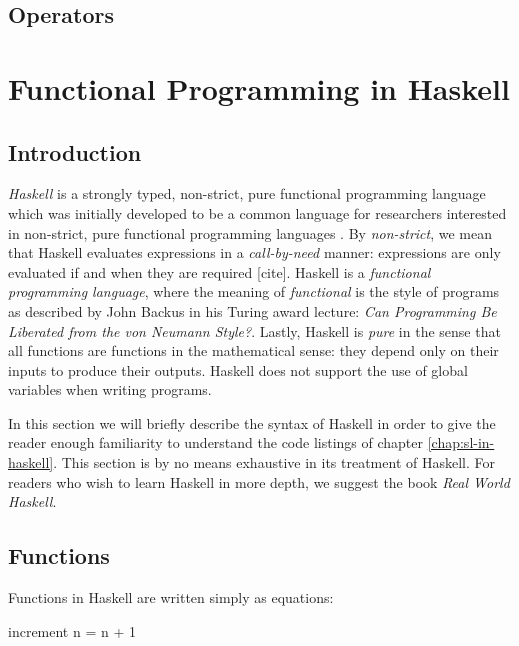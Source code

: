 \documentclass[thesis.tex]{subfiles}
\begin{document}
\subsection{Operators}






\section{Functional Programming in Haskell}

\subsection{Introduction}

\emph{Haskell} is a strongly typed, non-strict, pure functional
programming language \cite{hudak1992report} which was initially
developed to be a common language for researchers interested in
non-strict, pure functional programming languages
\cite{hudak2007history}.
By \emph{non-strict}, we mean that Haskell
evaluates expressions in a \emph{call-by-need} manner: expressions are
only evaluated if and when they are required [cite]. Haskell is a
\emph{functional programming language}, where the meaning of
\emph{functional} is the style of programs as described by John Backus
in his Turing award lecture: \emph{Can Programming Be Liberated from
  the von Neumann Style?}\cite{backus1978can}.  Lastly, Haskell is
\emph{pure} in the sense that all functions are functions in the
mathematical sense: they depend only on their inputs to produce their
outputs. Haskell does not support the use of global variables when
writing programs.

In this section we will briefly describe the syntax of Haskell in
order to give the reader enough familiarity to understand the code
listings of chapter \ref{chap:sl-in-haskell}. This section is by no
means exhaustive in its treatment of Haskell. For readers who wish to
learn Haskell in more depth, we suggest the book \emph{Real World
  Haskell}.



\subsection{Functions}

Functions in Haskell are written simply as equations:

\begin{spec}
increment n = n + 1
\end{spec}
\end{document}
